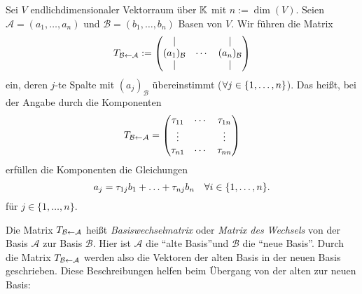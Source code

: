 Sei $ V $ endlichdimensionaler Vektorraum über $ \mathbb K $ mit $ n := \dim(V) $. Seien $ \mathcal{A} = (a_1, \ldots, a_n) $ und $ \mathcal{B} = (b_1, \ldots, b_n) $ Basen von $ V $. Wir führen die Matrix 
\begin{equation}
T_{\mathcal{B} \leftarrow \mathcal{A}} := \begin{pmatrix} 
| & & |
\\ (a_1)_{\mathcal{B}} & \cdots & (a_n)_{\mathcal{B}} 
\\ | & & | 
\end{pmatrix} 
\end{equation}
 ein, deren $ j $-te Spalte mit $ (a_j)_\mathcal{B} $ übereinstimmt ($ \forall j \in \{ 1,\ldots,n \} $). Das heißt, bei der Angabe durch die Komponenten
\begin{equation}
	T_{\mathcal{B} \leftarrow \mathcal{A}} =
	\begin{pmatrix}
		\tau_{11} & \cdots & \tau_{1n} \\
		\vdots &   & \vdots \\
		\tau_{n1} & \cdots & \tau_{nn}
	\end{pmatrix}
\end{equation}
erfüllen die Komponenten die Gleichungen
\begin{equation}
	a_j = \tau_{1j}b_1 + \ldots + \tau_{nj}b_n \quad \forall i \in \{ 1,\ldots,n \}.
\end{equation}
für $j \in \{1,\ldots,n\}$. 

Die Matrix $ T_{\mathcal{B} \leftarrow \mathcal{A}} $ heißt \emph{Basiswechselmatrix} oder \emph{Matrix des Wechsels} von der Basis $ \mathcal{A} $ zur Basis $ \mathcal{B} $. Hier ist $\mathcal{A}$ die ``alte Basis''und $\mathcal{B}$ die ``neue Basis''. Durch die Matrix $ T_{\mathcal{B} \leftarrow \mathcal{A}} $ werden also die Vektoren der alten Basis in der neuen Basis geschrieben. Diese Beschreibungen helfen beim Übergang von der alten zur neuen Basis: 

